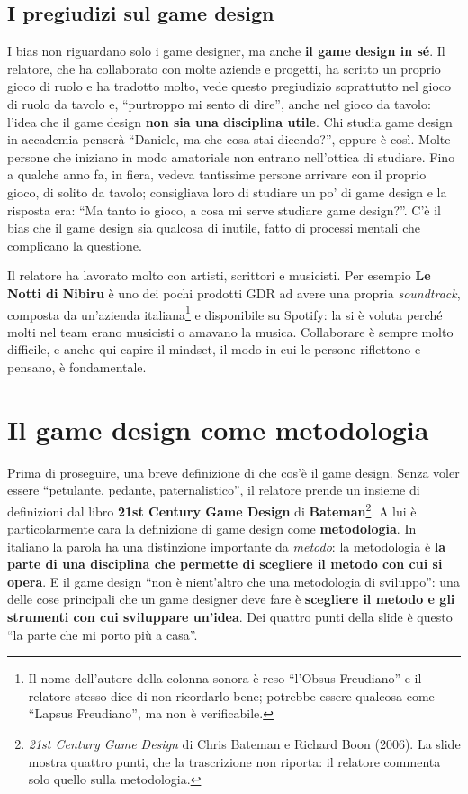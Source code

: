 \subsection{I pregiudizi sul game design}

I bias non riguardano solo i game designer, ma anche \textbf{il game design in
sé}. Il relatore, che ha collaborato con molte aziende e progetti, ha scritto
un proprio gioco di ruolo e ha tradotto molto, vede questo pregiudizio
soprattutto nel gioco di ruolo da tavolo e, ``purtroppo mi sento di dire'',
anche nel gioco da tavolo: l'idea che il game design \textbf{non sia una
disciplina utile}. Chi studia game design in accademia penserà ``Daniele, ma
che cosa stai dicendo?'', eppure è così. Molte persone che iniziano in modo
amatoriale non entrano nell'ottica di studiare. Fino a qualche anno fa, in
fiera, vedeva tantissime persone arrivare con il proprio gioco, di solito da
tavolo; consigliava loro di studiare un po' di game design e la risposta era:
``Ma tanto io gioco, a cosa mi serve studiare game design?''. C'è il bias che
il game design sia qualcosa di inutile, fatto di processi mentali che
complicano la questione.

Il relatore ha lavorato molto con artisti, scrittori e musicisti. Per esempio
\textbf{Le Notti di Nibiru} è uno dei pochi prodotti GDR ad avere una propria
\emph{soundtrack}, composta da un'azienda italiana\footnote{Il nome dell'autore
della colonna sonora è reso ``l'Obsus Freudiano'' e il relatore stesso dice di
non ricordarlo bene; potrebbe essere qualcosa come ``Lapsus Freudiano'', ma non
è verificabile.} e disponibile su Spotify: la si è voluta perché molti nel team
erano musicisti o amavano la musica. Collaborare è sempre molto difficile, e
anche qui capire il mindset, il modo in cui le persone riflettono e pensano, è
fondamentale.

\section{Il game design come metodologia}
\label{sec:z6-metodologia}

Prima di proseguire, una breve definizione di che cos'è il game design. Senza
voler essere ``petulante, pedante, paternalistico'', il relatore prende un
insieme di definizioni dal libro \textbf{21st Century Game Design} di
\textbf{Bateman}\footnote{\emph{21st Century Game Design} di Chris Bateman e
Richard Boon (2006). La slide mostra quattro punti, che la trascrizione non
riporta: il relatore commenta solo quello sulla metodologia.}. A lui è
particolarmente cara la definizione di game design come \textbf{metodologia}.
In italiano la parola ha una distinzione importante da \emph{metodo}: la
metodologia è \textbf{la parte di una disciplina che permette di scegliere il
metodo con cui si opera}. E il game design ``non è nient'altro che una
metodologia di sviluppo'': una delle cose principali che un game designer deve
fare è \textbf{scegliere il metodo e gli strumenti con cui sviluppare
un'idea}. Dei quattro punti della slide è questo ``la parte che mi porto più a
casa''.

